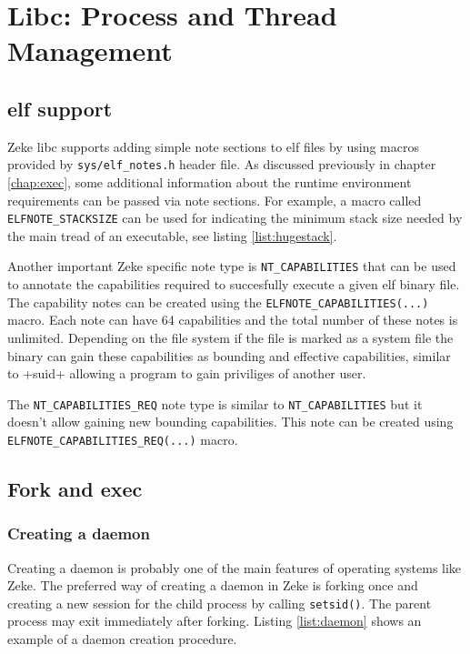 \chapter{Libc: Process and Thread Management}

\section{\acs{elf} support}\label{sec:libc_elf}

Zeke libc supports adding simple note sections to \acs{elf} files by using
macros provided by \verb+sys/elf_notes.h+ header file. As discussed
previously in chapter \ref{chap:exec}, some additional information about the
runtime environment requirements can be passed via note sections. For example,
a macro called \verb+ELFNOTE_STACKSIZE+ can be used for indicating the minimum
stack size needed by the main tread of an executable, see listing
\ref{list:hugestack}.

Another important Zeke specific note type is \verb+NT_CAPABILITIES+ that
can be used to annotate the capabilities required to succesfully execute
a given elf binary file. The capability notes can be created using the
\verb+ELFNOTE_CAPABILITIES(...)+ macro. Each note can have 64
capabilities and the total number of these notes is unlimited. Depending
on the file system if the file is marked as a system file the binary can
gain these capabilities as bounding and effective capabilities, similar
to \ver+suid+ allowing a program to gain priviliges of another user.

The \verb+NT_CAPABILITIES_REQ+ note type is similar to
\verb+NT_CAPABILITIES+ but it doesn't allow gaining new bounding
capabilities. This note can be created using
\verb+ELFNOTE_CAPABILITIES_REQ(...)+ macro.



\section{Fork and exec}

\subsection{Creating a daemon}

Creating a daemon is probably one of the main features of operating systems
like Zeke. The preferred way of creating a daemon in Zeke is forking once and
creating a new session for the child process by calling \verb+setsid()+. The
parent process may exit immediately after forking. Listing \ref{list:daemon}
shows an example of a daemon creation procedure.

